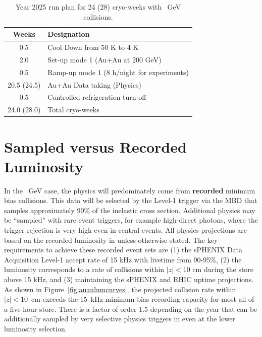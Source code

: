 \begin{table}
\centering
\begin{tabular}{ | c | l | }
\hline
Weeks & Designation \\ \hline
0.5  & Cool Down from 50 K to 4 K \\ \hline
2.0  & Set-up mode 1 (Au+Au at 200 GeV) \\ \hline
0.5  & Ramp-up mode 1 (8 h/night for experiments) \\ \hline
20.5 (24.5) & Au+Au Data taking (Physics) \\ \hline
0.5  & Controlled refrigeration turn-off \\ \hline \hline \hline
24.0 (28.0) & Total cryo-weeks \\
\hline
\end{tabular}
\caption{Year 2025 run plan for 24 (28) cryo-weeks with ~GeV collisions.\label{tab:cryoplan2025}}
\end{table}

\section{Sampled versus Recorded Luminosity}

In the ~GeV case, the physics will predominately come from {\bf recorded} minimum bias collisions.   This data will be selected by the Level-1 trigger via the MBD that samples approximately 90\% of the inelastic cross section.   Additional physics may be ``sampled'' with rare event triggers, for
example high-\pt direct photons, where the trigger rejection is very high even in central \auau events.   All physics projections are based on the recorded luminosity in \auau unless otherwise stated.     
The key requirements to achieve these recorded event sets are (1) the sPHENIX Data Acquisition Level-1 accept rate of 15 kHz with livetime from 90-95\%, (2) the luminosity corresponds to a rate of collisions within $|z|<$10 cm during the store above 15 kHz, and (3) maintaining the sPHENIX and RHIC uptime projections. 
As shown in Figure~\ref{fig:auaulumcurves}, the projected \auau collision rate within $|z|<10$~cm exceeds the 15~kHz minimum bias recording capacity for most all of a five-hour store.   There is a factor of order 1.5 depending on the year that can be additionally sampled by very selective physics triggers in \auau even at the lower luminosity selection.

